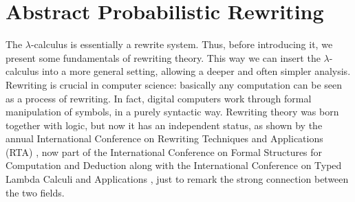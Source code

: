 \chapter{Abstract Probabilistic Rewriting}\label{ch:mathtest} %
The $\lambda$-calculus is essentially a rewrite system. Thus, before introducing it, we present some fundamentals of rewriting theory. This way we can insert the $\lambda$-calculus into a more general setting, allowing a deeper and often simpler analysis. Rewriting is crucial in computer science: basically any computation can be seen as a process of rewriting. In fact, digital computers work through formal manipulation of symbols, in a purely syntactic way. Rewriting theory was born together with logic, but now it has an independent status, as shown by the annual International Conference on Rewriting Techniques and Applications (RTA) \cite{noauthor_rewriting_nodate}, now part of the International Conference on Formal Structures for Computation and Deduction along with the  International Conference on Typed Lambda Calculi and Applications \cite{noauthor_typed_nodate}, just to remark the strong connection between the two fields.
